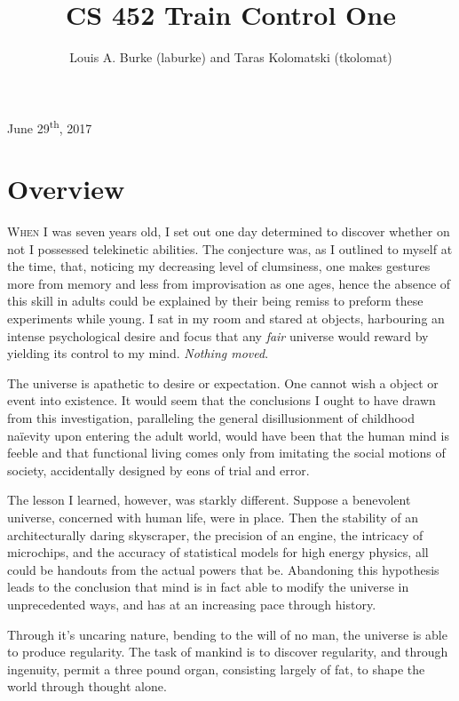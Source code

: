 \documentclass{amsart}
\title{CS 452 Train Control One \vspace{-0.65cm}}
\date{Louis A. Burke (laburke) and Taras Kolomatski (tkolomat)}
\begin{document}
\maketitle

\begin{center}
\vspace{-0.58cm}
June 29\textsuperscript{th}, 2017
\end{center}

\section*{Overview}

\textsc{When} I was seven years old, I set out one day determined to discover whether on not I possessed telekinetic abilities. The conjecture was, as I outlined to myself at the time, that, noticing my decreasing level of clumsiness, one makes gestures more from memory and less from improvisation as one ages, hence the absence of this skill in adults could be explained by their being remiss to preform these experiments while young. I sat in my room and stared at objects, harbouring an intense psychological desire and focus that any \textit{fair} universe would reward by yielding its control to my mind. \textit{Nothing moved}.

The universe is apathetic to desire or expectation. One cannot wish a object or event into existence. It would seem that the conclusions I ought to have drawn from this investigation, paralleling the general disillusionment of childhood na\"ievity upon entering the adult world, would have been that the human mind is feeble and that functional living comes only from imitating the social motions of society, accidentally designed by eons of trial and error.

The lesson I learned, however, was starkly different. Suppose a benevolent universe, concerned with human life, were in place. Then the stability of an architecturally daring skyscraper, the precision of an engine, the intricacy of microchips, and the accuracy of statistical models for high energy physics, all could be handouts from the actual powers that be. Abandoning this hypothesis leads to the conclusion that mind is in fact able to modify the universe in unprecedented ways, and has at an increasing pace through history.

Through it's uncaring nature, bending to the will of no man, the universe is able to produce regularity. The task of mankind is to discover regularity, and through ingenuity, permit a three pound organ, consisting largely of fat, to shape the world through thought alone.
\end{document}
